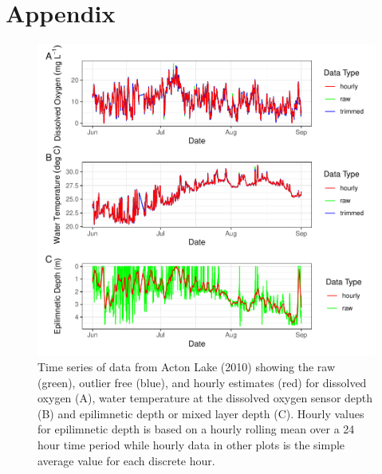 \documentclass[12pt, oneside]{article}
\begin{document}
\section*{Appendix}
\renewcommand{\figurename}{Appendix}
\setcounter{figure}{0}
\begin{figure}[h]
\centering
\includegraphics{appendix1.pdf}
\caption{Time series of data from Acton Lake (2010) showing the raw (green), outlier free (blue), and hourly estimates (red) for dissolved oxygen (A), water temperature at the dissolved oxygen sensor depth (B) and epilimnetic depth or mixed layer depth (C). Hourly values for epilimnetic depth is based on a hourly rolling mean over a 24 hour time period while hourly data in other plots is the simple average value for each discrete hour.}
\label{Appendix:appendix_trimmed}
\vspace{-20pt}
\end{figure}
\clearpage
\end{document}
